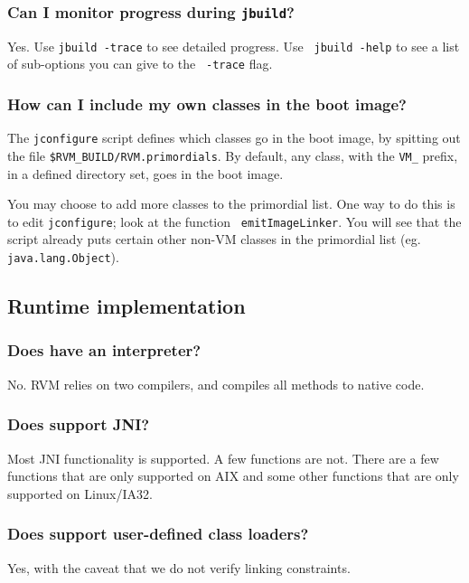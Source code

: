 \subsubsection{Can I monitor progress during {\tt jbuild}?}

Yes.  Use {\tt jbuild -trace} to see detailed progress.  Use {\tt
jbuild -help} to see a list of sub-options you can give to the {\tt
-trace} flag.

\subsubsection{How can I include my own classes in the boot image?}

The {\tt jconfigure} script defines which classes go in the boot image, by
spitting out the file {\tt \$RVM\_BUILD/RVM.primordials}.  By default, any
class, with the {\tt VM\_} prefix, in a defined directory set, goes in the
boot image.

You may choose to add more classes to the primordial list.  One way to do
this is to edit {\tt jconfigure}; look at the function {\tt
emitImageLinker}.  You will see that the script already puts certain other
non-VM classes in the primordial list (eg. {\tt java.lang.Object}).

\subsection{Runtime implementation}

\subsubsection{Does \jrvm{} have an interpreter?}

No.  RVM relies on two compilers, and compiles all methods to native code.

\subsubsection{Does \jrvm{} support JNI?}

Most JNI functionality is supported. A few functions are not. 
There are a few functions that are only supported on AIX\TMweb{}
and some other functions that are only supported on Linux\Rweb{}/IA32.

\subsubsection{Does \jrvm{} support user-defined class loaders?}
Yes, with the caveat that we do not verify linking constraints.

